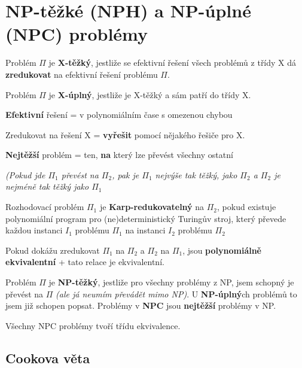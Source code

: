 \section{NP-těžké (NPH) a NP-úplné (NPC) problémy}

Problém $\Pi$ je \textbf{X-těžký}, jestliže se efektivní řešení všech problémů z třídy X dá \textbf{zredukovat} na efektivní řešení problému $\Pi$.

\vspace{4pt}
\noindent Problém $\Pi$ je \textbf{X-úplný}, jestliže je X-těžký a sám patří do třídy X.

\vspace{4pt}
\noindent \textbf{Efektivní} řešení = v polynomiálním čase s omezenou chybou

\vspace{4pt}
\noindent Zredukovat na řešení X = \textbf{vyřešit} pomocí nějakého řešiče pro X.

\vspace{4pt}
\noindent \textbf{Nejtěžší} problém = ten, \textbf{na} který lze převést všechny ostatní

\vspace{4pt}
\noindent \textit{(Pokud jde $\Pi_1$ převést na $\Pi_2$, pak je $\Pi_1$ nejvýše tak těžký, jako $\Pi_2$ a $\Pi_2$ je nejméně tak těžký jako $\Pi_1$}

\vspace{4pt}
\noindent Rozhodovací problém $\Pi_1$ je \textbf{Karp-redukovatelný} na $\Pi_2$, pokud existuje polynomiální program pro (ne)deterministický Turingův stroj, který převede každou instanci $I_1$ problému $\Pi_1$ na instanci $I_2$ problému $\Pi_2$

\vspace{4pt}
\noindent Pokud dokážu zredukovat $\Pi_1$ na $\Pi_2$ a $\Pi_2$ na $\Pi_1$, jsou \textbf{polynomiálně ekvivalentní} + tato relace je ekvivalentní.

\vspace{4pt}
\noindent Problém $\Pi$ je \textbf{NP-těžký}, jestliže pro všechny problémy z NP, jsem schopný je převést na $\Pi$ \textit{(ale já neumím převádět mimo NP)}. U \textbf{NP-úplný}ch problémů to jsem již schopen popsat. Problémy v \textbf{NPC} jsou \textbf{nejtěžší} problémy v NP.

\vspace{4pt}
\noindent Všechny NPC problémy tvoří třídu ekvivalence.

\subsection{Cookova věta}

